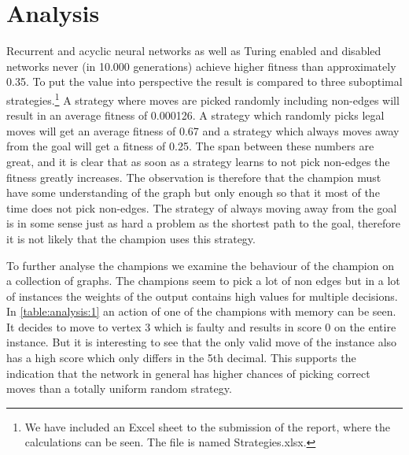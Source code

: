 
\section{Analysis}
\newpar Recurrent and acyclic neural networks as well as Turing enabled and disabled networks never (in 10.000 generations) achieve higher fitness than approximately 0.35. To put the value into perspective the result is compared to three suboptimal strategies.\footnote{We have included an Excel sheet to the submission of the report, where the calculations can be seen. The file is named Strategies.xlsx.} A strategy where moves are picked randomly including non-edges will result in an average fitness of 0.000126. A strategy which randomly picks legal moves will get an average fitness of 0.67 and a strategy which always moves away from the goal will get a fitness of 0.25. The span between these numbers are great, and it is clear that as soon as a strategy learns to not pick non-edges the fitness greatly increases. The observation is therefore that the champion must have some understanding of the graph but only enough so that it most of the time does not pick non-edges. The strategy of always moving away from the goal is in some sense just as hard a problem as the shortest path to the goal, therefore it is not likely that the champion uses this strategy. 

\newpar To further analyse the champions we examine the behaviour of the champion on a collection of graphs. The champions seem to pick a lot of non edges but in a lot of instances the weights of the output contains high values for multiple decisions. In \autoref{table:analysis:1} an action of one of the champions with memory can be seen. It decides to move to vertex 3 which is faulty and results in score 0 on the entire instance. But it is interesting to see that the only valid move of the instance also has a high score which only differs in the 5th decimal. This supports the indication that the network in general has higher chances of picking correct moves than a totally uniform random strategy.

